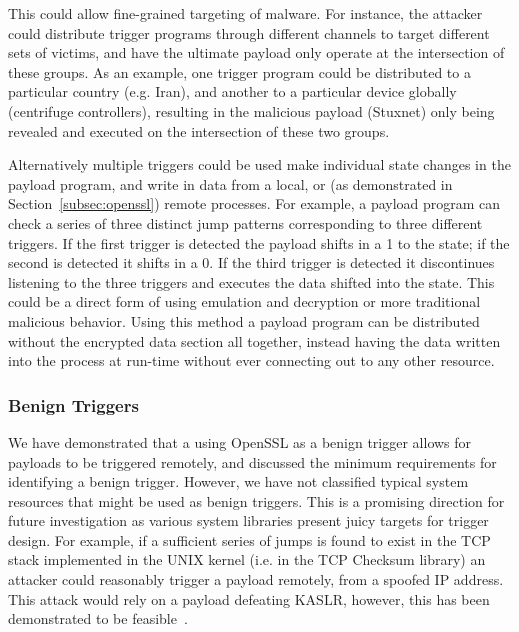 This could allow fine-grained targeting of malware. For instance, the attacker
could distribute trigger programs through different channels to target different sets
of victims, and have the ultimate payload only operate at the intersection of
these groups. As an example, one trigger program could be distributed to a
particular country (e.g. Iran), and another to a particular device globally
(centrifuge controllers), resulting in the malicious payload (Stuxnet) only
being revealed and executed on the intersection of these two groups.


\smallskip

Alternatively multiple triggers could be used make individual state changes in
the payload program, and write in data from a local, or (as demonstrated in
Section~\ref{subsec:openssl}) remote processes. For example, a payload program
can check a series of three distinct jump patterns corresponding to three
different triggers. If the first trigger is detected the payload shifts in a 1
to the state; if the second is detected it shifts in a 0. If the third trigger
is detected it discontinues listening to the three triggers and executes the
data shifted into the state.
This could be a direct form of \speculake using emulation and
decryption or more traditional malicious behavior. Using this method a payload
program can be distributed without the encrypted data section all together,
instead having the data written into the process at run-time without ever
connecting out to any other resource.

\subsubsection{Benign Triggers}
We have demonstrated that a using \allowbreak OpenSSL as a benign trigger allows for
\speculake payloads to be triggered remotely, and discussed the minimum
requirements for identifying a benign trigger. However, we have not classified
typical system resources that might be used as benign triggers. This is a
promising direction for future investigation as various system libraries present
juicy targets for trigger design. For example, if a sufficient series of jumps
is found to exist in the TCP stack implemented in the UNIX kernel (i.e. in the
TCP Checksum library) an attacker could reasonably trigger a \speculake payload
remotely, from a spoofed IP address. This attack would rely on a payload
defeating KASLR, however, this has been demonstrated to be
feasible~\cite{gruss2017kaslr,evtyushkin2016jump}.

